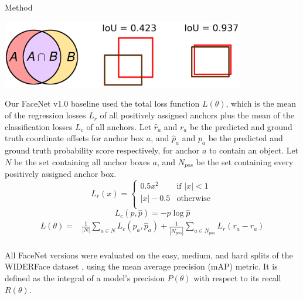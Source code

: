\documentclass[paperwidth=24in,paperheight=48in, fontscale=0.4166666666666]{baposter}
\begin{document}
\begin{poster}
\begin{posterbox}[name=method,column=0,below=background]{Method}
\begin{center}
\begin{minipage}{0.9\textwidth}
\begin{center}
  \includegraphics[width=10.6cm]{iou.png}
  \label{figiou}
\end{center}
\end{minipage}
\end{center}
\color{black!100}
Our FaceNet v1.0 baseline used the total loss function $L(\theta)$, which is the mean of the regression losses $L_r$ of all positively assigned anchors plus the mean of the classification losses $L_c$ of all anchors. Let $\hat{r}_a$ and $r_a$ be the predicted and ground truth coordinate offsets for anchor box $a$, and $\hat{p}_a$ and $p_a$ be the predicted and ground truth probability score respectively, for anchor $a$ to contain an object. Let $N$ be the set containing all anchor boxes $a$, and $N_{pos}$ be the set containing every positively assigned anchor box.
\begin{equation}\label{eqfacenetsoftmax}
L_r(x) = \begin{cases}
				0.5x^2 & \mbox{if } |x| < 1\\
				|x| - 0.5 & \mbox{otherwise}\\
			\end{cases}
\end{equation}
\begin{equation}\label{eqsmoothl1loss}
L_c(p, \hat{p}) = -p \log{\hat{p}}
\end{equation}
\begin{equation}
\begin{split}
	L(\theta) = &  \frac{1}{|N|} \sum_{a \in N} L_c(p_a, \hat{p}_a) 
	 + \frac{1}{|N_{pos}|} \sum_{a \in N_{pos}} L_r(r_a - \hat{r}_a)  \\ 
\end{split}
\end{equation}

All FaceNet versions were evaluated on the easy, medium, and hard splits of the WIDERFace dataset \cite{WIDERFace}, using the mean average precision (mAP) metric. It is defined as the integral of a model's precision $P(\theta)$ with respect to its recall $R(\theta)$.


\end{posterbox}
\end{poster}
\end{document}
